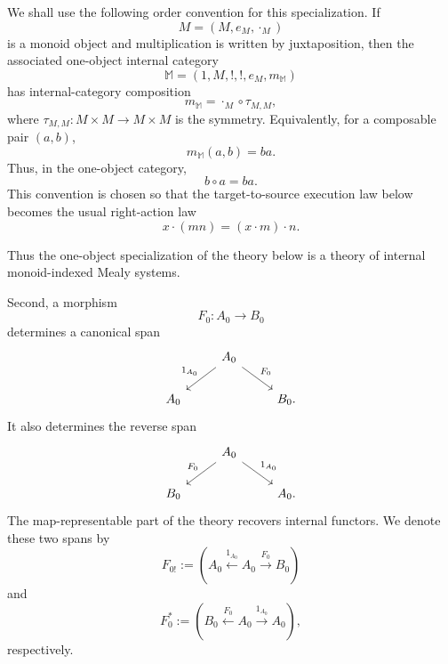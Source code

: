 We shall use the following order convention for this specialization. If
\[
    M=(M,e_M,\cdot_M)
\]
is a monoid object and multiplication is written by juxtaposition, then the associated one-object internal category
\[
    \mathbb M=(1,M,!,!,e_M,m_{\mathbb M})
\]
has internal-category composition
\[
    m_{\mathbb M}
    =
    \cdot_M\circ\tau_{M,M},
\]
where \(\tau_{M,M}:M\times M\to M\times M\) is the symmetry. Equivalently, for a composable pair \((a,b)\),
\[
    m_{\mathbb M}(a,b)=ba.
\]
Thus, in the one-object category,
\[
    b\circ a=ba.
\]
This convention is chosen so that the target-to-source execution law below becomes the usual right-action law
\[
    x\cdot(mn)=(x\cdot m)\cdot n.
\]

Thus the one-object specialization of the theory below is a theory of internal monoid-indexed Mealy systems.

Second, a morphism
\[
    F_0:A_0\to B_0
\]
determines a canonical span
\[
    \begin{tikzcd}
        & 
            A_0 
                \arrow[dl, "1_{A_0}"'] 
                \arrow[dr, "F_0"] 
        & 
        \\
            A_0 
        &
        & 
            B_0.
    \end{tikzcd}
\]
It also determines the reverse span
\[
    \begin{tikzcd}
        & 
            A_0 
                \arrow[dl, "F_0"'] 
                \arrow[dr, "1_{A_0}"] 
        & 
        \\
            B_0 
        &
        & 
            A_0.
    \end{tikzcd}
\]
The map-representable part of the theory recovers internal functors.
We denote these two spans by
\[
    F_{0!}
    :=
    \left(
        A_0
        \xleftarrow{1_{A_0}}
        A_0
        \xrightarrow{F_0}
        B_0
    \right)
\]
and
\[
    F_0^\ast
    :=
    \left(
        B_0
        \xleftarrow{F_0}
        A_0
        \xrightarrow{1_{A_0}}
        A_0
    \right),
\]
respectively.

